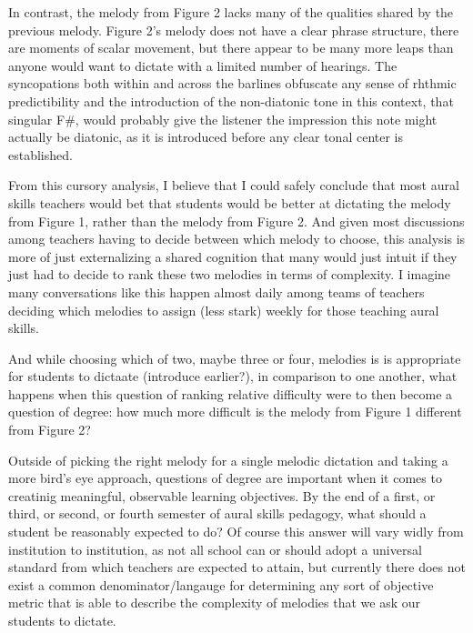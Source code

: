 \documentclass[english,man,floatsintext]{apa6}
\begin{document}
In contrast, the melody from Figure 2 lacks many of the qualities shared by the previous melody.
Figure 2's melody does not have a clear phrase structure, there are moments of scalar movement, but there appear to be many more leaps than anyone would want to dictate with a limited number of hearings.
The syncopations both within and across the barlines obfuscate any sense of rhthmic predictibility and the introduction of the non-diatonic tone in this context, that singular F\#, would probably give the listener the impression this note might actually be diatonic, as it is introduced before any clear tonal center is established.

From this cursory analysis, I believe that I could safely conclude that most aural skills teachers would bet that students would be better at dictating the melody from Figure 1, rather than the melody from Figure 2.
And given most discussions among teachers having to decide between which melody to choose, this analysis is more of just externalizing a shared cognition that many would just intuit if they just had to decide to rank these two melodies in terms of complexity.
I imagine many conversations like this happen almost daily among teams of teachers deciding which melodies to assign (less stark) weekly for those teaching aural skills.

And while choosing which of two, maybe three or four, melodies is is appropriate for students to dictaate (introduce earlier?), in comparison to one another, what happens when this question of ranking relative difficulty were to then become a question of degree: how much more difficult is the melody from Figure 1 different from Figure 2?

Outside of picking the right melody for a single melodic dictation and taking a more bird's eye approach, questions of degree are important when it comes to creatinig meaningful, observable learning objectives.
By the end of a first, or third, or second, or fourth semester of aural skills pedagogy, what should a student be reasonably expected to do?
Of course this answer will vary widly from institution to institution, as not all school can or should adopt a universal standard from which teachers are expected to attain, but currently there does not exist a common denominator/langauge for determining any sort of objective metric that is able to describe the complexity of melodies that we ask our students to dictate.
\end{document}
